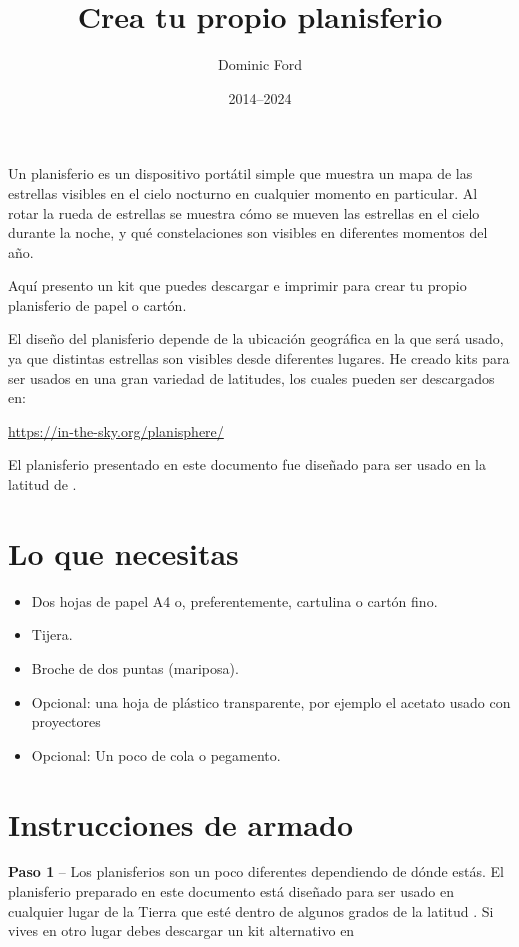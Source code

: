 \documentclass[a4paper,onecolumn,10pt]{article}
\title{Crea tu propio planisferio}
\author{Dominic Ford}
\date{2014--2024}
\begin{document}
\maketitle
\setcounter{footnote}{1}

Un planisferio es un dispositivo portátil simple que muestra un mapa de las estrellas visibles
en el cielo nocturno en cualquier momento en particular. Al rotar la rueda de estrellas se muestra
cómo se mueven las estrellas en el cielo durante la noche, y qué constelaciones son visibles
en diferentes momentos del año.

Aquí presento un kit que puedes descargar e imprimir para crear tu propio
planisferio de papel o cartón.

El diseño del planisferio depende de la ubicación geográfica en la que será usado,
ya que distintas estrellas son visibles desde diferentes lugares. He creado kits
para ser usados en una gran variedad de latitudes, los cuales pueden ser descargados en:

\url{https://in-the-sky.org/planisphere/}

El planisferio presentado en este documento fue diseñado para ser usado en la latitud de
.

\section*{Lo que necesitas}

\begin{itemize}
\item Dos hojas de papel A4 o, preferentemente, cartulina o cartón fino.
\item Tijera.
\item Broche de dos puntas (mariposa).
\item Opcional: una hoja de plástico transparente, por ejemplo el acetato usado con proyectores
\item Opcional: Un poco de cola o pegamento.
\end{itemize}

\section*{Instrucciones de armado}

{\bf Paso 1} -- Los planisferios son un poco diferentes dependiendo de dónde estás.
El planisferio preparado en este documento está diseñado para ser usado en cualquier
lugar de la Tierra que esté dentro de algunos grados de la latitud .
Si vives en otro lugar debes descargar un kit alternativo en
\end{document}
